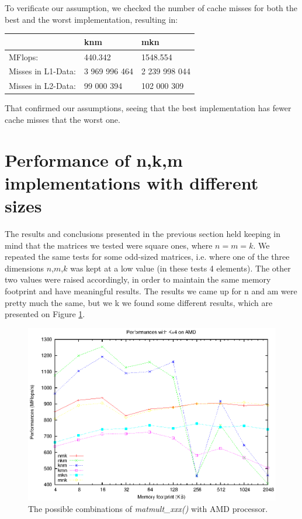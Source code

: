 To verificate our assumption, we checked the number of cache misses for both the best and the worst implementation, resulting in:

\vspace{10pt} 
\begin{tabular}{ l l l}
\hline
 & knm& mkn\\ \hline
MFlops:        &  440.342& 1548.554 \\ \hline
Misses in L1-Data:     & 3 969 996 464 & 2 239 998 044 \\ \hline
Misses in L2-Data:     & 99 000 394 & 102 000 309\\ \hline

\end{tabular}

\vspace{10pt} 

That confirmed our assumptions, seeing that the best implementation has fewer cache misses that the worst one.

\section{Performance of n,k,m implementations with different sizes}
The results and conclusions presented in the previous section held keeping in mind that the matrices we tested were square ones, where $n=m=k$. We repeated the same tests for some odd-sized matrices, i.e. where one of the three dimensions $n$,$m$,$k$ was kept at a low value (in these tests 4 elements). The other two values were raised accordingly, in order to maintain the same memory footprint and have meaningful results. The results we came up for n and am were pretty much the same, but we k we found some different results, which are presented on Figure \ref{fig:lowk}.

\begin{figure}[here]
\centering
\includegraphics[width=\textwidth]{results/littlek.eps}
\caption{The possible combinations of \emph{matmult\_xxx()} with AMD processor.}
\label{fig:lowk}
\end{figure}

